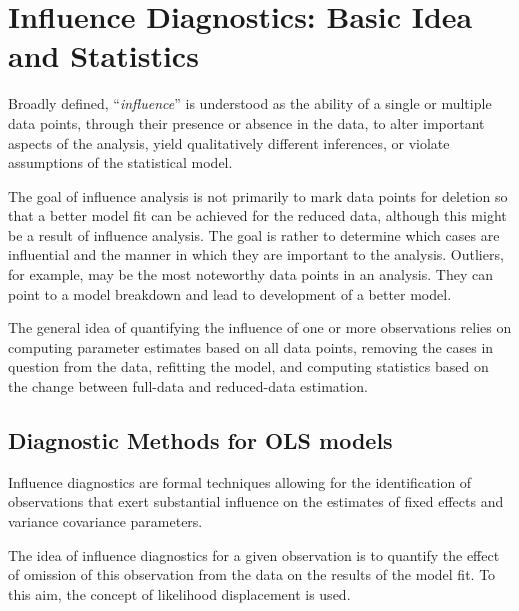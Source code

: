 \documentclass[12pt, a4paper]{report}
\theoremstyle{plain}
\theoremstyle{definition}
\theoremstyle{remark}
\begin{document}
\newpage



		\section{Influence Diagnostics: Basic Idea and Statistics} %
		Broadly defined, ``\textit{influence}” is understood as the ability of a single or multiple data points, through their presence or absence in the data, to alter important aspects of the analysis, yield qualitatively different inferences, or
		violate assumptions of the statistical model. 
		
		
		The goal of influence analysis is not primarily to mark data
		points for deletion so that a better model fit can be achieved for the reduced data, although this might be a
		result of influence analysis. The goal is rather to determine which cases are influential and the manner in
		which they are important to the analysis. Outliers, for example, may be the most noteworthy data points in
		an analysis. They can point to a model breakdown and lead to development of a better model.
		
		
		The general idea of quantifying the influence of one or more observations relies on computing parameter estimates based on all data points, removing the cases in question from the data, refitting the model, and computing statistics based on the change between full-data and reduced-data estimation. 
		
		\subsection{Diagnostic Methods for OLS models}
		Influence diagnostics are formal techniques allowing for the identification of observations that exert substantial 
		influence on the estimates of fixed effects and variance covariance parameters. 
		
		The idea of influence diagnostics for a given observation is to quantify the effect of omission of this observation 
		from the data on the results of the model fit. To this aim, the concept of likelihood displacement is used. 
		
\end{document}
